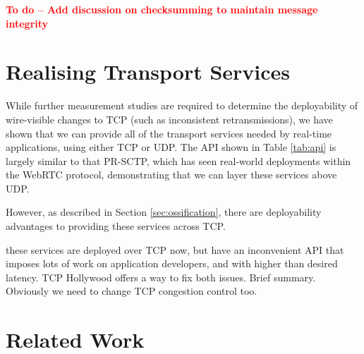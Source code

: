 \documentclass{sig-alternate-05-2015}
\newcommand{\todo}[1]{\textbf{\textcolor{red}{To do -- #1}}}
\begin{document}
\todo{Add discussion on checksumming to maintain message integrity}

\section{Realising Transport Services}
\label{sec:realising}

While further measurement studies are required to determine the
deployability of wire-visible changes to TCP (such as inconsistent
retransmissions), we have shown that we can provide all of the transport 
services needed by real-time applications, using either TCP or UDP. The
API shown in Table \ref{tab:api} is largely similar to that PR-SCTP, which
has seen real-world deployments within the WebRTC protocol, demonstrating
that we can layer these services above UDP.

However, as described in Section \ref{sec:ossification}, there are
deployability advantages to providing these services across TCP. 

these services are deployed over TCP now, but have an inconvenient API that
imposes lots of work on application developers, and with higher than desired
latency. 
TCP Hollywood offers a way to fix both issues.
Brief summary.
Obviously we need to change TCP congestion control too.

\section{Related Work}
\label{sec:related}

%
% 
\end{document}
